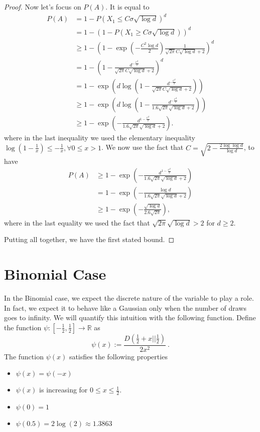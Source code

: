 \documentclass{article}
\newcommand{\field}[1]{\mathbb{#1}}
\newcommand{\R}{\field{R}}
\begin{document}
\begin{proof}
Now let's focus on $P(A)$. It is equal to
\begin{align*}
P(A)
&= 1-P(X_1\leq C \sigma \sqrt{\log d})^d \\
&= 1-(1-P(X_1\geq C \sigma \sqrt{\log d}))^d \\
&\geq 1-\left(1-\exp\left(-\frac{C^2 \log d}{2}\right) \frac{1}{\sqrt{2\pi}C \sqrt{\log d}+2}\right)^d \\
&= 1-\left(1-\frac{d^{-\frac{C^2}{2}}}{\sqrt{2\pi}C \sqrt{\log d}+2}\right)^d \\
&= 1- \exp\left(d \log\left(1-\frac{d^{-\frac{C^2}{2}}}{\sqrt{2\pi}C \sqrt{\log d}+2}\right)\right) \\
&\geq 1- \exp\left(d \log\left(1-\frac{d^{-\frac{C^2}{2}}}{1.6 \sqrt{2\pi} \sqrt{\log d}+2}\right)\right) \\
&\geq 1 - \exp\left(-\frac{d^{1-\frac{C^2}{2}}}{1.6 \sqrt{2\pi} \sqrt{\log d}+2}\right).
\end{align*}
where in the last inequality we used the elementary inequality $\log(1-\frac{1}{x}) \leq -\frac{1}{x}, \forall  0\leq x>1$.
We now use the fact that $C=\sqrt{2- \frac{2 \log \log d}{\log d}}$, to have
\begin{align*}
P(A)
& \geq 1 - \exp\left(-\frac{d^{1-\frac{C^2}{2}}}{1.6 \sqrt{2\pi} \sqrt{\log d}+2}\right) \\
& = 1 - \exp\left(-\frac{\log d}{1.6 \sqrt{2\pi} \sqrt{\log d}+2}\right) \\
& \geq 1 - \exp\left(-\frac{\sqrt{\log d}}{2.6 \sqrt{2\pi}}\right),
\end{align*}
where in the last equality we used the fact that $\sqrt{2\pi} \sqrt{\log d} > 2$ for $d\geq 2$.

Putting all together, we have the first stated bound.
\end{proof}

\section{Binomial Case}
\label{section:maximum-of-random-walks}

In the Binomial case, we expect the discrete nature of the variable to play a role. In fact, we expect it to behave like a Gaussian only when the number of draws goes to infinity.
We will quantify this intuition with the following function.
Define the function $\psi:[-\frac{1}{2},\frac{1}{2}] \rightarrow \R$ as
\[
\psi(x):=\frac{D(\frac{1}{2}+x||\frac{1}{2})}{2 x^2}~.
\]
The function $\psi(x)$ satisfies the following properties
\begin{itemize}
\item $\psi(x)=\psi(-x)$
\item $\psi(x)$ is increasing for $0\leq x \leq\frac{1}{2}$.
\item $\psi(0)=1$
\item $\psi(0.5)=2 \log(2) \approx 1.3863$
\end{itemize}
\end{document}
